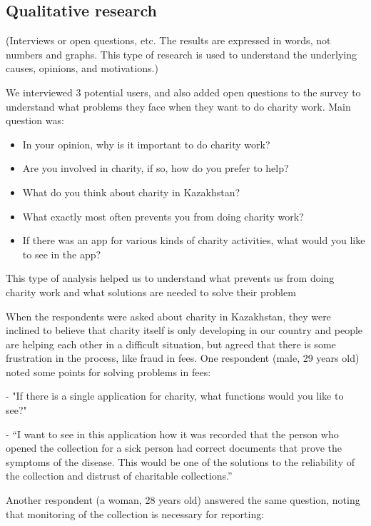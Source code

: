 \subsection{Qualitative research}

(Interviews or open questions, etc. The results are expressed in words, not numbers and graphs. This type of research is used to understand the underlying causes, opinions, and motivations.)

We interviewed 3 potential users, and also added open questions 
to the survey to understand what problems they face when they want to do charity work. 
Main question was:
\begin{itemize}
    \item In your opinion, why is it important to do charity work?
    \item Are you involved in charity, if so, how do you prefer to help?
    \item What do you think about charity in Kazakhstan?
    \item What exactly most often prevents you from doing charity work?
    \item If there was an app for various kinds of charity activities, what would you like to see in the app?
\end{itemize}

This type of analysis helped us to understand what prevents us from doing charity work and what solutions are needed to solve their problem

When the respondents were asked about charity in Kazakhstan, they were inclined to believe that charity itself is only developing in our country and people are helping each other in a difficult situation, but agreed that there is some frustration in the process, like fraud in fees. One respondent (male, 29 years old) noted some points for solving problems in fees:

- "If there is a single application for charity, what functions would you like to see?"

- “I want to see in this application how it was recorded that the person who opened the collection for a sick person had correct documents that prove the symptoms of the disease. This would be one of the solutions to the reliability of the collection and distrust of charitable collections.”

Another respondent (a woman, 28 years old) answered the same question, noting that monitoring of the collection is necessary for reporting:

